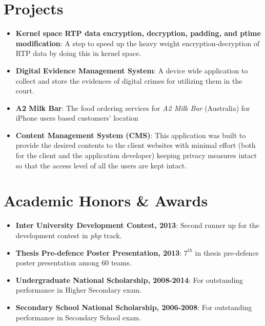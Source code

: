 \documentclass[letterpaper,11pt]{article}
\newcommand{\resumeItem}[2]{
  \item\small{
    \textbf{#1}{: #2 \vspace{-2pt}}
  }
}
\newcommand{\resumeSubItem}[2]{\resumeItem{#1}{#2}\vspace{-4pt}}
\newcommand{\resumeSubHeadingListStart}{\begin{itemize}[leftmargin=*]}
\newcommand{\resumeSubHeadingListEnd}{\end{itemize}}
\begin{document}
\section{Projects}
    \resumeSubHeadingListStart
        \resumeSubItem
            {Kernel space RTP data encryption, decryption, padding, and ptime modification}
            {A step to speed up the heavy weight encryption-decryption of RTP data by doing this in kernel space.}%
        \resumeSubItem
            {Digital Evidence Management System}
            {A device wide application to collect and store the evidences of digital crimes for utilizing them in the court.}%
        \resumeSubItem
            {A2 Milk Bar}
            {The food ordering services for \textit{A2 Milk Bar} (Australia) for iPhone users based customers’ location}%
        \resumeSubItem
            {Content Management System (CMS)}
            {This application was built to provide the desired contents to the client websites with minimal effort (both for the client and the application developer) keeping privacy measures intact so that the access level of all the users are kept intact.}%
        
    \resumeSubHeadingListEnd
    
\section{Academic Honors \& Awards}
    \resumeSubHeadingListStart
        \resumeSubItem
            {Inter University Development Contest, 2013}
            {Second runner up for the development contest in \textit{php} track.}
        \resumeSubItem
            {Thesis Pre-defence Poster Presentation, 2013}
            {$7^{th}$ in thesis pre-defence poster presentation among 60 teams.}
        \resumeSubItem
            {Undergraduate National Scholarship, 2008-2014}
            {For outstanding performance in Higher Secondary exam.}
        \resumeSubItem
            {Secondary School National Scholarship, 2006-2008}
            {For outstanding performance in Secondary School exam.}
    \resumeSubHeadingListEnd
    
\end{document}
